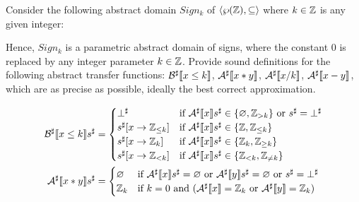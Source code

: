 \begin{exercise}{
    Consider the following abstract domain $Sign_k$ of $\left<\wp(\mathbb{Z}), \subseteq\right>$ where $k \in \mathbb{Z}$ is any given integer:
    \begin{center}
    \end{center}
    Hence, $Sign_k$ is a parametric abstract domain of signs, where the constant 0 is replaced by any integer parameter $k \in \mathbb{Z}$. Provide sound definitions for the following abstract transfer functions: $\mathcal{B}^\sharp \llbracket x \leq k \rrbracket$, $\mathcal{A}^\sharp \llbracket x * y \rrbracket$, $\mathcal{A}^\sharp \llbracket x / k \rrbracket$, $\mathcal{A}^\sharp \llbracket x - y \rrbracket$, which are as precise as possible, ideally the best correct approximation.
}
    \begin{align*}
        \mathcal{B}^\sharp \llbracket x \leq k \rrbracket s^\sharp &= \begin{cases}
            \bot^\sharp & \text{if } \mathcal{A}^\sharp \llbracket x \rrbracket s^\sharp \in \{ \varnothing, \mathbb{Z}_{>k} \} \text{ or } s^\sharp = \bot^\sharp \\
            s^\sharp [x \to \mathbb{Z}_{\leq k}] & \text{if } \mathcal{A}^\sharp \llbracket x \rrbracket s^\sharp \in \{ \mathbb{Z}, \mathbb{Z}_{\leq k} \} \\
            s^\sharp [x \to \mathbb{Z}_k] & \text{if } \mathcal{A}^\sharp \llbracket x \rrbracket s^\sharp \in \{ \mathbb{Z}_k, \mathbb{Z}_{\geq k} \} \\
            s^\sharp [x \to \mathbb{Z}_{< k}] & \text{if } \mathcal{A}^\sharp \llbracket x \rrbracket s^\sharp \in \{ \mathbb{Z}_{< k}, \mathbb{Z}_{\neq k} \}
        \end{cases} \\
        \mathcal{A}^\sharp \llbracket x * y \rrbracket s^\sharp &= \begin{cases}
            \varnothing & \text{if } \mathcal{A}^\sharp \llbracket x \rrbracket s^\sharp = \varnothing \text{ or } \mathcal{A}^\sharp \llbracket y \rrbracket s^\sharp = \varnothing \text{ or } s^\sharp = \bot^\sharp \\
            \mathbb{Z}_k & \text{if } k = 0 \text{ and } (\mathcal{A}^\sharp \llbracket x \rrbracket = \mathbb{Z}_k \text{ or } \mathcal{A}^\sharp \llbracket y \rrbracket = \mathbb{Z}_k) \\

\end{cases}
\end{align*}
\end{exercise}

